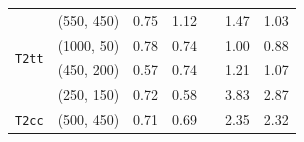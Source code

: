 \begin{table}[!t]
\begin{tabular}{ llccccc }
                                            & (550, 450)    & 0.75 & 1.12 &  & 1.47 & 1.03 \\ [0.5ex]
    \multirow{2}{*}{\texttt{T2tt}}          & (1000, 50)    & 0.78 & 0.74 &  & 1.00 & 0.88 \\
                                            & (450, 200)    & 0.57 & 0.74 &  & 1.21 & 1.07 \\ 
                                            & (250, 150)    & 0.72 & 0.58 &  & 3.83 & 2.87 \\ [0.5ex]
    \multirow{1}{*}{\texttt{T2cc}}          & (500, 450)    & 0.71 & 0.69 &  & 2.35 & 2.32 \\ [0.5ex]
    \hline
  \end{tabular}
\end{table}


